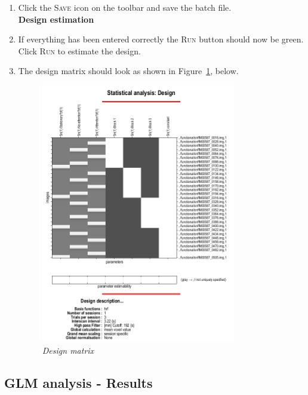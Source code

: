 \begin{enumerate}
\item Click the \textsc{Save} icon on the toolbar and save the batch file.\\

\textbf{Design estimation}\\
\item If everything has been entered correctly the \textsc{Run} button should now be green. Click \textsc{Run} to estimate the design.
\item The design matrix should look as shown in Figure~\ref{fig:ppi7}, below.

\begin{figure}[!ht]
\centering\includegraphics[width=85mm]{ppi/figures/Fig7.png}
\caption{\em Design matrix}
\label{fig:ppi7}
\end{figure}
\end{enumerate}

\subsection{GLM analysis - Results}

